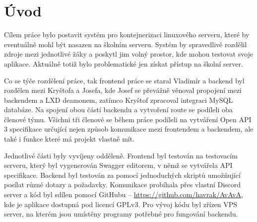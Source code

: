 \chapter*{Úvod}

Cílem práce bylo postavit systém pro kontejnerizaci linuxového serveru, které by eventuálně mohl být nasazen na školním serveru.
Systém by spravedlivě rozdělil zdroje mezi jednotlivé žáky a poskytl jim volný prostor, kde mohou testovat svoje aplikace.
Aktuálně totiž bylo problematické jen získat přístup na školní server.

Co se týče rozdělení práce, tak frontend práce se staral Vladimír a backend byl rozdělen mezi Kryštofa a Josefa, kde Josef se převážně věnoval propojení mezi backendem a LXD deamonem, zatímco Kryštof zpracoval integraci MySQL databáze.
Na spojení obou částí backendu a vytvoření route se podíleli oba členové týmu.
Všichni tři členové se během práce podíleli na vytváření Open API 3 specifikace určující nejen způsob komunikace mezi frontendem a backendem, ale také i funkce které má projekt vlastně mít.

Jednotlivé části byly vyvíjeny odděleně.
Frontend byl testován na testovacím serveru, který byl vygenerován Swagger editorem, v němž se vytvářela API specifikace.
Backend byl testován za pomocí jednoduchých skriptů umožňující posílat různé dotazy a požadavky.
Komunikace probíhala přes vlastní Discord server a kód byl sdílen pomocí GitHubu -- \url{https://github.com/havrak/AvAvA}, kde je aplikace dostupná pod licencí GPLv3. Pro vývoj kódu byl zřízen VPS server, na kterém jsou umístěny programy potřebné pro fungování backendu.
